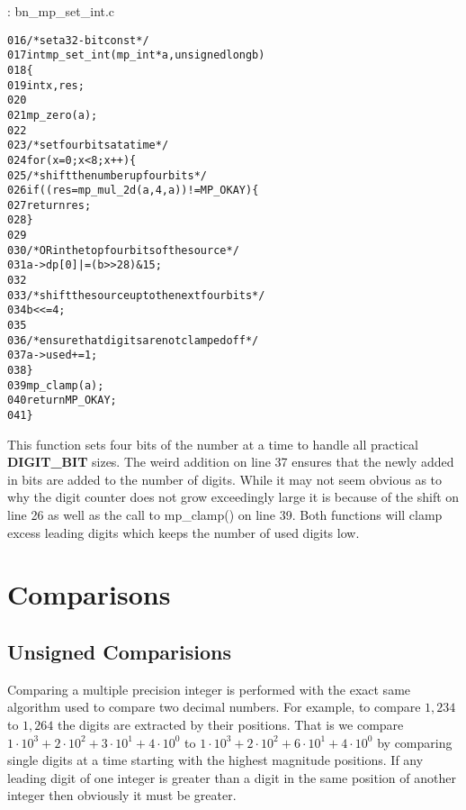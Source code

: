 \documentclass[b5paper]{book}
\begin{document}
\vspace{+3mm}\begin{small}
\hspace{-5.1mm}{\bf File}: bn\_mp\_set\_int.c
\vspace{-3mm}
\begin{alltt}
016   /* set a 32-bit const */
017   int mp_set_int (mp_int * a, unsigned long b)
018   \{
019     int     x, res;
020   
021     mp_zero (a);
022     
023     /* set four bits at a time */
024     for (x = 0; x < 8; x++) \{
025       /* shift the number up four bits */
026       if ((res = mp_mul_2d (a, 4, a)) != MP_OKAY) \{
027         return res;
028       \}
029   
030       /* OR in the top four bits of the source */
031       a->dp[0] |= (b >> 28) & 15;
032   
033       /* shift the source up to the next four bits */
034       b <<= 4;
035   
036       /* ensure that digits are not clamped off */
037       a->used += 1;
038     \}
039     mp_clamp (a);
040     return MP_OKAY;
041   \}
\end{alltt}
\end{small}

This function sets four bits of the number at a time to handle all practical \textbf{DIGIT\_BIT} sizes.  The weird
addition on line 37 ensures that the newly added in bits are added to the number of digits.  While it may not 
seem obvious as to why the digit counter does not grow exceedingly large it is because of the shift on line 26 
as well as the  call to mp\_clamp() on line 39.  Both functions will clamp excess leading digits which keeps 
the number of used digits low.

\section{Comparisons}
\subsection{Unsigned Comparisions}
Comparing a multiple precision integer is performed with the exact same algorithm used to compare two decimal numbers.  For example,
to compare $1,234$ to $1,264$ the digits are extracted by their positions.  That is we compare $1 \cdot 10^3 + 2 \cdot 10^2 + 3 \cdot 10^1 + 4 \cdot 10^0$
to $1 \cdot 10^3 + 2 \cdot 10^2 + 6 \cdot 10^1 + 4 \cdot 10^0$ by comparing single digits at a time starting with the highest magnitude 
positions.  If any leading digit of one integer is greater than a digit in the same position of another integer then obviously it must be greater.  
\end{document}
